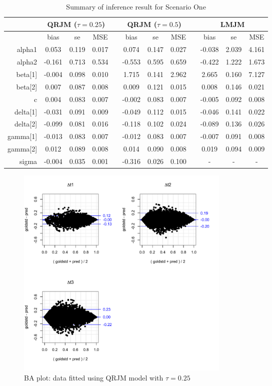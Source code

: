 \documentclass{article}
\begin{document}
\begin{table}[H]
\centering
\caption{Summary of inference result for Scenario One}
\begin{tabular}{rccccccccccc}
\hline
& \multicolumn{3}{c}{QRJM ($\tau=0.25$)} & &\multicolumn{3}{c}{QRJM ($\tau=0.5$)} & & \multicolumn{3}{c}{LMJM}\\
\hline
 & bias & se & MSE & & bias & se & MSE & & bias & se & MSE \\
 \cline{2-4}  \cline{6-8}  \cline{10-12}
  alpha1 & 0.053 & 0.119 & 0.017 & & 0.074 & 0.147 & 0.027 & & -0.038 & 2.039 & 4.161 \\
  alpha2 & -0.161 & 0.713 & 0.534 & & -0.553 & 0.595 & 0.659 & & -0.422 &1.222 & 1.673 \\
  beta[1] & -0.004 & 0.098 & 0.010 & & 1.715 & 0.141 & 2.962 & & 2.665 &0.160 & 7.127 \\
  beta[2] & 0.007 & 0.087 & 0.008 & & 0.009 & 0.121 & 0.015 & & 0.008 & 0.146 &  0.021 \\
  c & 0.004 & 0.083 & 0.007 & & -0.002 & 0.083 & 0.007 & & -0.005 & 0.092 &  0.008 \\
  delta[1] & -0.031 & 0.091 & 0.009 & & -0.049 & 0.112 & 0.015 & & -0.046 & 0.141 & 0.022 \\
  delta[2] & -0.099 & 0.081 & 0.016 & & -0.118 & 0.102 & 0.024 & & -0.089 & 0.136 &  0.026 \\
  gamma[1] & -0.013 & 0.083 & 0.007 & & -0.012 & 0.083 & 0.007 & & -0.007 & 0.091 &  0.008 \\
  gamma[2] & 0.012 & 0.089 & 0.008 & & 0.014 & 0.090 & 0.008 & & 0.019 & 0.094 &  0.009 \\
  sigma & -0.004 & 0.035 & 0.001 & & -0.316 & 0.026 & 0.100 & & - & - & - \\
   \hline
\end{tabular}
\end{table}




\begin{figure}[H]
\centering
\includegraphics[width=0.5\textwidth]{ba_qt25data_qt25fit.pdf}
\caption{BA plot: data fitted using QRJM model with $\tau=0.25$}
\end{figure}
\end{document}
